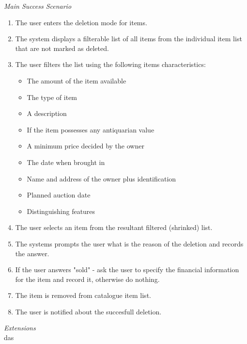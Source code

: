 \textsl{Main Success Scenario}
\begin{enumerate}[noitemsep]
	\item The user enters the deletion mode for items.
	\item The system displays a filterable list of all items from the individual item list that are not marked as deleted.
	\item The user filters the list using the following items characteristics:
	\begin{itemize}[noitemsep]
		\item The amount of the item available
		\item The type of item
		\item A description
		\item If the item possesses any antiquarian value
		\item A minimum price decided by the owner
		\item The date when brought in
		\item Name and address of the owner plus identification
		\item Planned auction date
		\item Distinguishing features
	\end{itemize}
	\item The user selects an item from the resultant filtered (shrinked) list.
	\item The systems prompts the user what is the reason of the deletion and records the answer.
	\item If the user answers "sold" - ask the user to specify the financial information for the item and record it, otherwise do nothing.
	\item The item is removed from catalogue item list.
	\item The user is notified about the succesfull deletion. 
\end{enumerate}
\textsl{Extensions}\\
\null\quad das
\\

